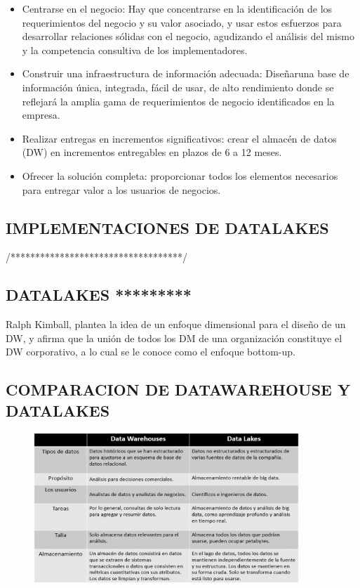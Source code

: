 \documentclass[%
 reprint,
 amsmath,amssymb,
 aps,
]{revtex4-1}
\begin{document}
\begin{itemize}
	\item Centrarse en el negocio: Hay que concentrarse en la identificación de los requerimientos del negocio y su valor asociado, y usar estos esfuerzos para desarrollar relaciones sólidas con el negocio, agudizando el análisis del mismo y la competencia consultiva de los implementadores. 
	\item Construir una infraestructura de información adecuada: Diseñaruna base de información única, integrada, fácil de usar, de alto rendimiento donde se reflejará la amplia gama de requerimientos de negocio identificados en la empresa. 
	\item Realizar entregas en incrementos significativos: crear el almacén de datos (DW) en incrementos entregables en plazos de 6 a 12 meses.
	\item Ofrecer la solución completa: proporcionar todos los elementos necesarios para entregar valor a los usuarios de negocios. 
\end{itemize}



\subsection{IMPLEMENTACIONES DE DATALAKES}

/***********************************/
\subsection{DATALAKES *********}

Ralph Kimball, plantea la idea de un enfoque dimensional para el diseño de un DW, y afirma que la unión de todos los DM de una organización constituye el DW corporativo, a lo cual se le conoce como el enfoque bottom-up.\\

 


\subsection{COMPARACION DE DATAWAREHOUSE Y DATALAKES}	
\begin{figure}[htb]
				\begin{center}
					\includegraphics[width=10cm]{./IMAGENES/Imagen1}
				\end{center}
			\end{figure}
\end{document}
